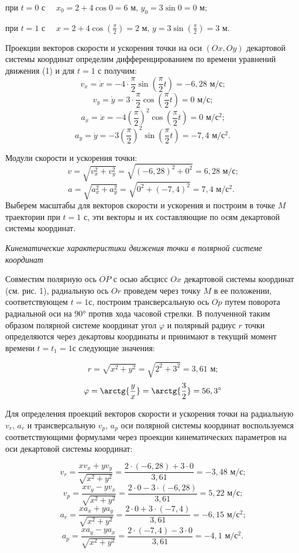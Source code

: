 \documentclass{article}
\begin{document}
при $t=0 \text{ с   } \quad x_0 = 2 + 4 \cos 0 = 6\text{ м, } y_0 = 3 \sin 0 = 0\text{ м;} $

при $t=1 \text{ с   } \quad x = 2 + 4 \cos\left(\frac{\pi}{2}\right) = 2 \text{ м, } y = 3 \sin\left(\frac{\pi}{2}\right) = 3 \text{ м.}$

Проекции векторов скорости и ускорения точки на оси $(Ox,Oy)$ декартовой системы
координат определим дифференцированием по времени уравнений движения (1) и для
$t=1\text{ с}$ получим:
$$v_x=\dot{x} = -4 \cdot \frac{\pi}{2} \sin\left(\frac{\pi}{2}t\right) = -6,28 \text{ м/с;}$$
$$v_y=\dot{y} = 3 \cdot \frac{\pi}{2} \cos\left(\frac{\pi}{2}t\right) = 0 \text{ м/с;}$$
$$a_x=\ddot{x} = -4 \left(\frac{\pi}{2}\right)^2 \cos\left(\frac{\pi}{2}t\right) = 0 \text{ м/с$^2$;}$$
$$a_y=\ddot{y} = -3 \left(\frac{\pi}{2}\right)^2 \sin\left(\frac{\pi}{2}t\right) = -7,4 \text{ м/с$^2$.}$$



Модули скорости и ускорения точки:
$$v=\sqrt{v_x^2+v_y^2}=\sqrt{(-6,28)^2+0^2}=6,28 \text{ м/с;}$$
$$a=\sqrt{a_x^2+a_y^2}=\sqrt{0^2+(-7,4)^2}=7,4 \text{ м/с$^2$. }$$
\newpage
Выберем масштабы для векторов скорости и ускорения и построим в точке $M$
траектории при $t=1$ с, эти векторы и их составляющие по осям декартовой
системы координат.

\bigskip

\textit{\textsf{Кинематические характеристики движения точки в
полярной системе координат}}

\bigskip

Совместим полярную ось $OP$ с осью абсцисс $Ox$ декартовой системы 
координат (см. рис. 1), радиальную ось $Or$ проведем через точку $M$ в ее
положении, соответствующем $t=1$с, построим трансверсальную ось $Op$ путем
поворота радиальной оси на $\ang{90}$ против хода часовой стрелки. В полученной
таким образом полярной системе координат угол $\varphi$ и полярный радиус $r$
точки определяются через декартовы координаты и принимают в текущий момент времени
$t=t_1=1$с следующие значения:

$$r=\sqrt{x^2+y^2}=\sqrt{2^2+3^2}=3,61 \text{ м;}$$
$$\varphi=\arctg{\frac{y}{x}}=\arctg{\frac{3}{2}}=56,3^\circ $$

Для определения проекций векторов скорости и ускорения точки на радиальную $v_r\text{, }a_r$
и трансверсальную $v_p\text{, }a_p$ оси полярной системы координат воспользуемся
соответствующими формулами через проекции кинематических параметров на оси декартовой
системы координат:

$$v_r=\frac{xv_x+yv_y}{\sqrt{x^2+y^2}}=\frac{2\cdot (-6,28)+3\cdot 0}{3,61} = -3,48 \text{ м/с;}$$
$$v_p=\frac{xv_y-yv_x}{\sqrt{x^2+y^2}}=\frac{2\cdot 0-3\cdot (-6,28)}{3,61} = 5,22 \text{ м/с;}$$
$$a_r=\frac{xa_x+ya_y}{\sqrt{x^2+y^2}}=\frac{2\cdot 0+3\cdot (-7,4)}{3,61} = -6,15 \text{ м/с$^2$;}$$
$$a_p=\frac{xa_y-ya_x}{\sqrt{x^2+y^2}}=\frac{2\cdot (-7,4)-3\cdot 0}{3,61} = -4,1 \text{ м/с$^2$.}$$
\end{document}
